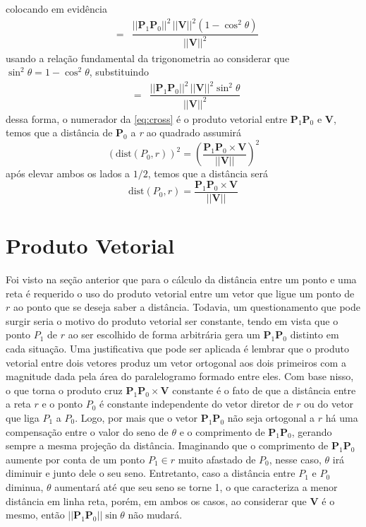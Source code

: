 \documentclass[a4paper, 12pt, brazilian]{article}
\newcommand{\vect}{\bm{P}_{1}\bm{P}_{0}}
\begin{document}
	colocando em evidência
	\begin{eqnarray}
		&=&\dfrac{||\vect||^{2}\,||\bm{V}||^{2}(1-\cos^{2}\theta)}{||\bm{V}||^{2}}
	\end{eqnarray}
	usando a relação fundamental da trigonometria ao considerar que $\sin^{2}\theta=1-\cos^{2}\theta$, substituindo
	\begin{eqnarray}
		\label{eq:cross}
		&=&\dfrac{||\vect||^{2}\,||\bm{V}||^{2}\sin^{2}\theta}{||\bm{V}||^{2}}
	\end{eqnarray}
	dessa forma, o numerador da \cref{eq:cross} é o produto vetorial entre $\vect$ e $\bm{V}$, temos que a distância de $\bm{P}_{0}$ a \textit{r} ao quadrado assumirá
	\begin{equation}
		(\textrm{dist}(P_{0},r))^{2}=\left(\dfrac{\vect\times\bm{V}}{||\bm{V}||}\right)^{\!\!2}
	\end{equation}
	após elevar ambos os lados a $1/2$, temos que a distância será
	\begin{equation}
		\textrm{dist}(P_{0},r)=\dfrac{\vect\times\bm{V}}{||\bm{V}||}
	\end{equation}
	\section{Produto Vetorial}
	Foi visto na seção anterior que para o cálculo da distância entre um ponto e uma reta é requerido o uso do produto vetorial 
	entre um vetor que ligue um ponto de $r$ ao ponto que se deseja saber a distância. Todavia, um questionamento que pode surgir seria o motivo do produto vetorial ser constante, tendo em vista que o ponto $P_{1}$ de $r$ ao ser escolhido de forma arbitrária gera um $\vect$ distinto em cada situação.\vspace{.25cm}
	Uma justificativa que pode ser aplicada é lembrar que o produto vetorial entre dois vetores produz um vetor ortogonal aos dois primeiros com a magnitude dada pela área do paralelogramo formado entre eles. Com base nisso, o que torna o produto cruz $\vect\times\bm{V}$ constante é o fato de que a distância entre a reta $r$ e o ponto $P_{0}$ é constante independente do vetor diretor de $r$ ou do vetor que liga $P_{1}$ a $P_{0}$. Logo, por mais que o vetor $\vect$ não seja ortogonal a $r$ há uma compensação entre o valor do seno de $\theta$ e o comprimento de $\vect$, gerando sempre a mesma projeção da distância. Imaginando que o comprimento de $\vect$ aumente por conta de um ponto $P_{1}\in r$ muito afastado de $P_{0}$, nesse caso, $\theta$ irá diminuir e junto dele o seu seno. Entretanto, caso a distância entre $P_{1}$ e $P_{0}$ diminua, $\theta$ aumentará até que seu seno se torne 1, o que caracteriza a menor distância em linha reta, porém, em ambos os casos, ao considerar que $\bm{V}$ é o mesmo, então $||\vect||\sin\theta$ não mudará.
	
\end{document}
